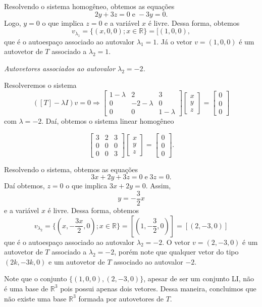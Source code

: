 \begin{enumerate}
Resolvendo o sistema homogêneo, obtemos  as equações  $$2y+3z=0 \; \text{e} \; -3y=0. $$  Logo,  $y=0$ o que implica $z=0$ e a variável $x$ é livre.  Dessa forma, obtemos $$v_{\lambda_1}=\{ (x, 0, 0 ); x \in \mathbb{R}\}=[(1,0,0), $$  que é o autoespaço associado ao autovalor $\lambda_1=1$. Já  o vetor $v=(1,0,0)$ é um autovetor de $T$ associado a $\lambda_2=1$.


\textit{{Autovetores associados ao autovalor $\lambda_2=-2$.}}

 Resolveremos o sistema
$$
([T]-\lambda I)v=0 \Rightarrow
\begin{bmatrix}
1 -\lambda & 2 & 3\\
0&-2-\lambda & 0\\
0&0&1-\lambda
\end{bmatrix}
 \begin{bmatrix}
x\\
y \\
z
\end{bmatrix}=
\begin{bmatrix}
0\\
0 \\
0
\end{bmatrix}
$$
com  $\lambda=-2$. Daí, obtemos o sistema linear homogêneo

$$
\begin{bmatrix}
3 & 2 & 3\\
0&0& 0\\
0&0&3
\end{bmatrix}
\begin{bmatrix}
x\\
y \\
z
\end{bmatrix}=
\begin{bmatrix}
0\\
0 \\
0
\end{bmatrix}.
$$

Resolvendo o sistema, obtemos  as equações  $$3x+2y+3z=0 \; \text{e} \; 3z=0. $$  Daí obtemos,  $z=0$ o que implica $3x+2y=0$. Assim,  $$ y= -\dfrac{3}{2}x$$   e a variável $x$ é livre.  Dessa forma, obtemos $$v_{\lambda_2}=\{ (x, -\dfrac{3x}{2}, 0 ); x \in \mathbb{R}\}=[(1,-\dfrac{3}{2},0)]=[(2,-3,0)] $$  que é o autoespaço associado ao autovalor $\lambda_2=-2$.  O vetor $v=(2,-3,0)$ é um autovetor de $T$ associado a $\lambda_2=-2$, porém note que qualquer vetor do tipo $( 2k, -3k,0)$ e um autovetor de $T$ associado ao autovalor $-2$.


Note que o conjunto $ \{ (1,0,0), (2,-3,0)\} $, apesar de ser um conjunto LI, não é uma base de $\mathbb{R}^3$ pois possui apenas dois vetores. Dessa maneira, concluimos que não existe uma base $\mathbb{R}^3$ formada por  autovetores de $T$.
\end{enumerate}

